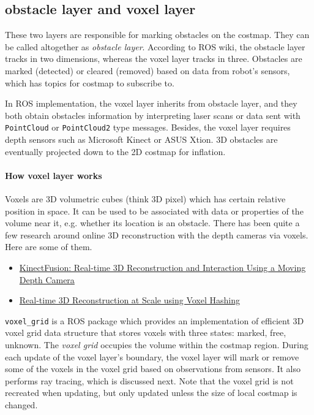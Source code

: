 \documentclass[12pt]{article}
\begin{document}
\subsection{obstacle layer and voxel layer} These two layers are responsible for marking obstacles on the costmap. They can be called altogether as \textit{obstacle layer}. According to ROS wiki, the obstacle layer tracks in two dimensions, whereas the voxel layer tracks in three. Obstacles are marked (detected) or cleared (removed) based on data from robot's sensors, which has topics for costmap to subscribe to.

In ROS implementation, the voxel layer inherits from obstacle layer, and they both obtain obstacles information by interpreting laser scans or data sent with \texttt{PointCloud} or \texttt{PointCloud2} type messages. Besides, the voxel layer requires depth sensors such as Microsoft Kinect or ASUS Xtion. 3D obstacles are eventually projected down to the 2D costmap for inflation.

\paragraph{How voxel layer works} Voxels are 3D volumetric cubes (think 3D pixel) which has certain relative position in space. It can be used to be associated with data or properties of the volume near it, e.g. whether its location is an obstacle. There has been quite a few research around online 3D reconstruction with the depth cameras via voxels. Here are some of them.

\begin{itemize}
    \item \href{http://delivery.acm.org/10.1145/2050000/2047270/p559-izadi.pdf?ip=128.208.7.188&id=2047270&acc=ACTIVE\%20SERVICE&key=B63ACEF81C6334F5\%2EF43F328D6C8418D0\%2E4D4702B0C3E38B35\%2E4D4702B0C3E38B35&CFID=830915711&CFTOKEN=23054788&__acm__=1472349664_9fd28ae246d72a507f6a93c5ac84a516}{KinectFusion: Real-time 3D Reconstruction and Interaction Using a Moving Depth Camera} 
    \item \href{https://people.mpi-inf.mpg.de/~mzollhoef/Papers/SGASIA2013_VH/paper.pdf}{Real-time 3D Reconstruction at Scale using Voxel Hashing}
\end{itemize}

\texttt{voxel\_grid} is a ROS package which provides an implementation of efficient 3D voxel grid data structure that stores voxels with three states: marked, free, unknown. The \textit{voxel grid} occupies the volume within the costmap region. During each update of the voxel layer's boundary, the voxel layer will mark or remove some of the voxels in the voxel grid based on observations from sensors. It also performs ray tracing, which is discussed next. Note that the voxel grid is not recreated when updating, but only updated unless the size of local costmap is changed.
\end{document}
